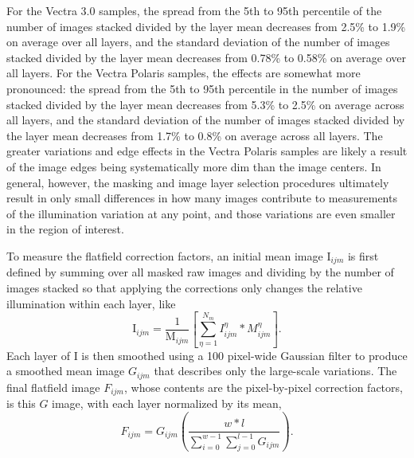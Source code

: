 \documentclass[letterpaper,11pt]{article}
\newcommand{\Iota}{\mathrm{I}}
\newcommand{\Mu}{\mathrm{M}}
\begin{document}
For the Vectra 3.0 samples, the spread from the 5th to 95th percentile of the number of images stacked divided by the layer mean decreases from 2.5\% to 1.9\% on average over all layers, and the standard deviation of the number of images stacked divided by the layer mean decreases from 0.78\% to 0.58\% on average over all layers. For the Vectra Polaris samples, the effects are somewhat more pronounced: the spread from the 5th to 95th percentile in the number of images stacked divided by the layer mean decreases from 5.3\% to 2.5\% on average across all layers, and the standard deviation of the number of images stacked divided by the layer mean decreases from 1.7\% to 0.8\% on average across all layers. The greater variations and edge effects in the Vectra Polaris samples are likely a result of the image edges being systematically more dim than the image centers. In general, however, the masking and image layer selection procedures ultimately result in only small differences in how many images contribute to measurements of the illumination variation at any point, and those variations are even smaller in the region of interest.

To measure the flatfield correction factors, an initial mean image $\Iota_{ijm}$ is first defined by summing over all masked raw images and dividing by the number of images stacked so that applying the corrections only changes the relative illumination within each layer, like
\begin{equation}
\Iota_{ijm} = \frac{1}{\Mu_{ijm}} \left[ \sum_{\eta=1}^{N_{m}} I^{\eta}_{ijm}*M^{\eta}_{ijm} \right] .
\end{equation}
Each layer of $\Iota$ is then smoothed using a 100 pixel-wide Gaussian filter to produce a smoothed mean image $G_{ijm}$ that describes only the large-scale variations. The final flatfield image $F_{ijm}$, whose contents are the pixel-by-pixel correction factors, is this $G$ image, with each layer normalized by its mean,
\begin{equation}
F_{ijm} = G_{ijm} \left( \frac{w*l}{\sum_{i=0}^{w-1}\sum_{j=0}^{l-1}G_{ijm}} \right) .
\end{equation}

\clearpage
\end{document}
